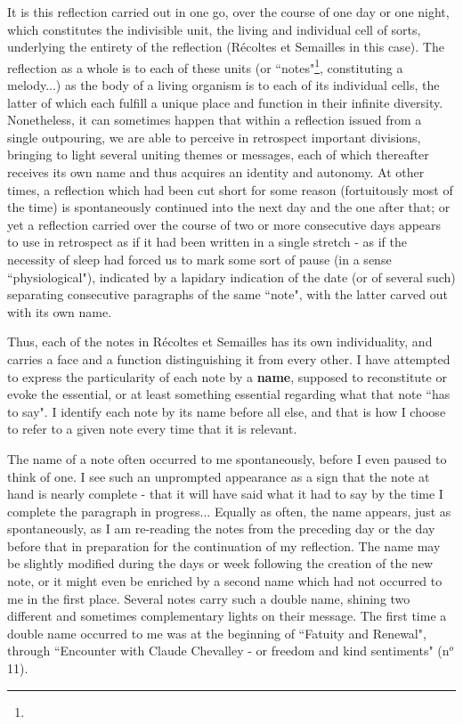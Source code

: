 It is this reflection carried out in one go, over the course of one day or one night, which constitutes the indivisible unit, the living and individual cell of sorts, underlying the entirety of the reflection (R\'ecoltes et Semailles in this case). The reflection as a whole is to each of these units (or ``notes"\footnote{}, constituting a melody...) as the body of a living organism is to each of its individual cells, the latter of which each fulfill a unique place and function in their infinite diversity. Nonetheless, it can sometimes happen that within a reflection issued from a single outpouring, we are able to perceive in retrospect important divisions, bringing to light several uniting themes or messages, each of which thereafter receives its own name and thus acquires an identity and autonomy. At other times, a reflection which had been cut short for some reason (fortuitously most of the time) is spontaneously continued into the next day and the one after that; or yet a reflection carried over the course of two or more consecutive days appears to use in retrospect as if it had been written in a single stretch - as if the necessity of sleep had forced us to mark some sort of pause (in a sense ``physiological"), indicated by a lapidary indication of the date (or of several such) separating consecutive paragraphs of the same ``note", with the latter carved out with its own name. 

Thus, each of the notes in R\'ecoltes et Semailles has its own individuality, and carries a face and a function distinguishing it from every other. I have attempted to express the particularity of each note by a \textbf{name}, supposed to reconstitute or evoke the essential, or at least something essential regarding what that note ``has to say". I identify each note by its name before all else, and that is how I choose to refer to a given note every time that it is relevant. 

The name of a note often occurred to me spontaneously, before I even paused to think of one. I see such an unprompted appearance as a sign that the note at hand is nearly complete - that it will have said what it had to say by the time I complete the paragraph in progress... Equally as often, the name appears, just as spontaneously, as I am re-reading the notes from the preceding day or the day before that in preparation for the continuation of my reflection. The name may be slightly modified during the days or week following the creation of the new note, or it might even be enriched by a second name which had not occurred to me in the first place. Several notes carry such a double name, shining two different and sometimes complementary lights on their message. The first time a double name occurred to me was at the beginning of ``Fatuity and Renewal", through ``Encounter with Claude Chevalley - or freedom and kind sentiments" (n$^o$11).

